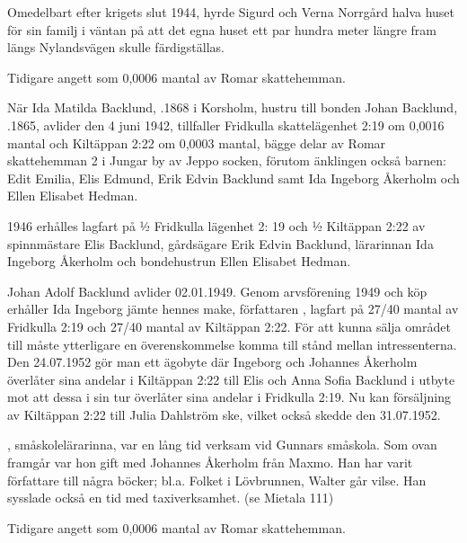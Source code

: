 Omedelbart efter krigets slut 1944, hyrde Sigurd och Verna Norrgård halva huset för sin familj i väntan på att det egna huset ett par hundra meter längre fram längs Nylandsvägen skulle färdigställas.


%

Tidigare angett som 0,0006 mantal av Romar skattehemman.


%
När Ida Matilda Backlund, .1868 i Korsholm, hustru till bonden Johan Backlund, .1865, avlider den 4 juni 1942, tillfaller Fridkulla skattelägenhet 2:19 om 0,0016 mantal och Kiltäppan 2:22 om 0,0003 mantal, bägge delar av Romar skattehemman 2 i Jungar by av Jeppo socken, förutom änklingen också barnen: Edit Emilia, Elis Edmund, Erik Edvin Backlund samt Ida Ingeborg Åkerholm och Ellen Elisabet Hedman.

1946 erhålles lagfart på ½ Fridkulla lägenhet 2: 19 och ½ Kiltäppan 2:22 av spinnmästare Elis Backlund, gårdsägare Erik Edvin Backlund, lärarinnan Ida Ingeborg Åkerholm och bondehustrun Ellen Elisabet Hedman.

Johan Adolf Backlund avlider 02.01.1949. Genom arvsförening 1949 och köp erhåller Ida Ingeborg jämte hennes make, författaren , lagfart på 27/40 mantal av Fridkulla 2:19 och 27/40 mantal av Kiltäppan 2:22. För att kunna sälja området till  måste ytterligare en överenskommelse komma till stånd mellan intressenterna. Den 24.07.1952 gör man ett ägobyte där Ingeborg och Johannes Åkerholm överlåter sina andelar i Kiltäppan 2:22 till Elis och Anna Sofia Backlund i utbyte mot att dessa i sin tur överlåter sina andelar i Fridkulla 2:19. Nu kan försäljning av Kiltäppan 2:22 till Julia Dahlström ske, vilket också skedde den 31.07.1952.

, småskolelärarinna, var en lång tid verksam vid Gunnars småskola. Som ovan framgår var hon gift med Johannes Åkerholm från Maxmo. Han har varit författare till några böcker; bl.a. Folket i Lövbrunnen, Walter går vilse. Han sysslade också en tid med taxiverksamhet. (se Mietala 111)


%

Tidigare angett som 0,0006 mantal av Romar skattehemman.



